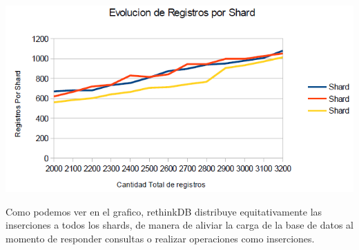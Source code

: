 \includegraphics[scale=0.75]{Shards.png}

Como podemos ver en el grafico, rethinkDB distribuye equitativamente las 
inserciones a todos los shards, de manera de aliviar la carga de la base 
de datos al momento de responder consultas o realizar operaciones 
como inserciones.
